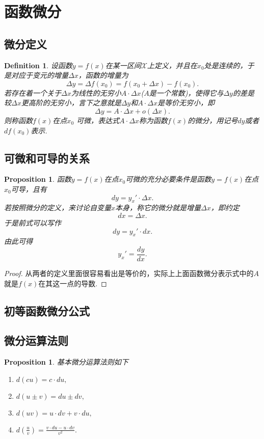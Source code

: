 \documentclass{article}
\newtheorem{proposition}[theorem]{Proposition}
\newtheorem{definition}[theorem]{Definition}
\begin{document}
\newpage
\section{函数微分}

\subsection{微分定义}
\begin{definition}
\rm 设函数$y=f(x)$在某一区间$\mathcal{X}$上定义，并且在$x_0$处是连续的，于是对应于变元的增量$\Delta x$，函数的增量为
$$
\Delta y = \Delta f(x_0) = f(x_0 + \Delta x) - f(x_0).
$$
若{\color{red}存在着一个关于$\Delta x$为线性的无穷小$A \cdot \Delta x$($A$是一个常数)，使得它与$\Delta y$的差是较$\Delta x$更高阶的无穷小}，{\color{blue}言下之意就是$\Delta y$和$A \cdot \Delta x$是等价无穷小}，即
$$
\Delta y = A \cdot \Delta x + o(\Delta x).
$$
则称函数$f(x)$在点$x_0$ {\color{red}可微}，表达式$A \cdot \Delta x$称为函数$f(x)$的{\color{red}微分}，用记号$dy$或者$df(x_0)$表示.
\end{definition}


\subsection{可微和可导的关系}

\begin{proposition}
\rm 函数$y=f(x)$在点$x_0$可微的充分必要条件是函数$y=f(x)$在点$x_0$可导，且有
$$
dy = y_x' \cdot \Delta x.
$$
若按照微分的定义，来讨论自变量$x$本身，称它的微分就是增量$\Delta x$，即约定
$$
dx = \Delta x.
$$
于是前式可以写作
$$
dy = y_x' \cdot dx.
$$
由此可得
$$
y_x' = \frac{dy}{dx}.
$$
\end{proposition}

\begin{proof}
{\color{blue}从两者的定义里面很容易看出是等价的，实际上上面函数微分表示式中的$A$就是$f(x)$在其这一点的导数}.
\end{proof}



\subsection{初等函数微分公式}


\subsection{微分运算法则}

\begin{proposition}
\rm 基本{\color{red}微分运算法则}如下
\begin{enumerate}
	\item $d(cu) = c\cdot du,$
	\item $d(u\pm v)= du \pm dv,$
	\item $d(uv) = u\cdot dv + v\cdot du,$
	\item $d(\frac{u}{v}) = \frac{v\cdot du - u \cdot dv}{v^2}.$
\end{enumerate}
\end{proposition}
\end{document}

